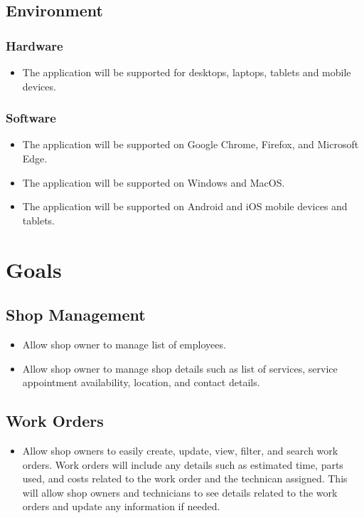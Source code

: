 \documentclass{article}
\begin{document}
\subsection{Environment}
\subsubsection{Hardware}
\begin{itemize}
    \item The application will be supported for desktops, laptops, tablets and mobile devices.
\end{itemize}
\subsubsection{Software}
\begin{itemize}
    \item The application will be supported on Google Chrome, Firefox, and Microsoft Edge.
    \item The application will be supported on Windows and MacOS.
    \item The application will be supported on Android and iOS mobile devices and tablets.
\end{itemize}

\section{Goals}
\subsection{Shop Management}
\begin{itemize}
    \item Allow shop owner to manage list of employees.
    \item Allow shop owner to manage shop details such as list of services, service appointment availability, location, and contact details.
\end{itemize}

\subsection{Work Orders}
\begin{itemize}
    \item Allow shop owners to easily create, update, view, filter, and search work orders. Work orders will 
    include any details such as estimated time, parts used, and costs related to the work order and the technican 
    assigned. This will allow shop owners and technicians to see details related to the work orders and update 
    any information if needed.
\end{itemize}
\end{document}
